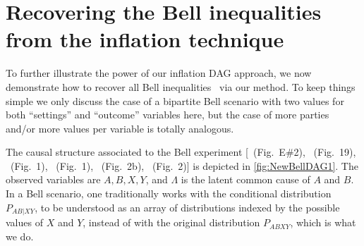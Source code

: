\documentclass[aps,english,10pt,superscriptaddress,onecolumn,twoside,longbibliography,pra,floatfix,fleqn,nofootinbib]{revtex4-1}%
\theoremstyle{definition}
\begin{document}
\section{Recovering the Bell inequalities from the inflation technique}
\label{sec:Bellscenarios}


To further illustrate the power of our inflation DAG approach, we now demonstrate how to recover all Bell inequalities~\cite{Brunner2013Bell,bell1966lhvm,CHSHOriginal} via our method. To keep things simple we only discuss the case of a bipartite Bell scenario with two values for both ``settings'' and ``outcome'' variables here, but the case of more parties and/or more values per variable is totally analogous.

The causal structure associated to the Bell \cite{bell1964einstein,Brunner2013Bell,bell1966lhvm,CHSHOriginal} experiment [\citealp{pusey2014gdag}~(Fig.~E\#2), \citealp{WoodSpekkens}~(Fig.~19), \citealp{chaves2014novel}~(Fig.~1), \citealp{BeyondBellII}~(Fig.~1), \citealp{wolfe2015nonconvexity}~(Fig.~2b), \citealp{steeg2011relaxation}~(Fig.~2)] is depicted in \cref{fig:NewBellDAG1}. The observed variables are $A,B,X,Y$, and $\Lambda$ is the latent common cause of $A$ and $B$. In a Bell scenario, one traditionally works with the conditional distribution $P_{AB|XY}$, to be understood as an array of distributions indexed by the possible values of $X$ and $Y$, instead of with the original distribution $P_{ABXY}$, which is what we do.
\end{document}
